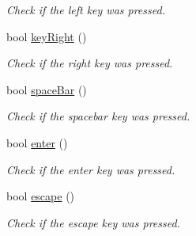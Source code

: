 \begin{DoxyCompactItemize}
\begin{DoxyCompactList}\small\item\em Check if the left key was pressed. \end{DoxyCompactList}\item 
\hypertarget{classty_s_f_m_l_1_1_input_a2480b6bb9098c1876cc462950beb4886}{}bool \hyperlink{classty_s_f_m_l_1_1_input_a2480b6bb9098c1876cc462950beb4886}{key\+Right} ()\label{classty_s_f_m_l_1_1_input_a2480b6bb9098c1876cc462950beb4886}

\begin{DoxyCompactList}\small\item\em Check if the right key was pressed. \end{DoxyCompactList}\item 
\hypertarget{classty_s_f_m_l_1_1_input_ab30405cb480389168c8cac1094d9615e}{}bool \hyperlink{classty_s_f_m_l_1_1_input_ab30405cb480389168c8cac1094d9615e}{space\+Bar} ()\label{classty_s_f_m_l_1_1_input_ab30405cb480389168c8cac1094d9615e}

\begin{DoxyCompactList}\small\item\em Check if the spacebar key was pressed. \end{DoxyCompactList}\item 
\hypertarget{classty_s_f_m_l_1_1_input_a72959951597a9d8409f356f2a0de8534}{}bool \hyperlink{classty_s_f_m_l_1_1_input_a72959951597a9d8409f356f2a0de8534}{enter} ()\label{classty_s_f_m_l_1_1_input_a72959951597a9d8409f356f2a0de8534}

\begin{DoxyCompactList}\small\item\em Check if the enter key was pressed. \end{DoxyCompactList}\item 
\hypertarget{classty_s_f_m_l_1_1_input_a3d7386ceb6fd504f366fbe5c7d5760d7}{}bool \hyperlink{classty_s_f_m_l_1_1_input_a3d7386ceb6fd504f366fbe5c7d5760d7}{escape} ()\label{classty_s_f_m_l_1_1_input_a3d7386ceb6fd504f366fbe5c7d5760d7}

\begin{DoxyCompactList}\small\item\em Check if the escape key was pressed. \end{DoxyCompactList}\end{DoxyCompactItemize}
